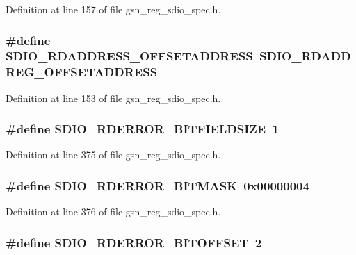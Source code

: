Definition at line 157 of file gsn\_\-reg\_\-sdio\_\-spec.h.

\hypertarget{a00571_a530884998f656b08aed3fd0bcf1faff3}{
\subsubsection[{SDIO\_\-RDADDRESS\_\-OFFSETADDRESS}]{\setlength{\rightskip}{0pt plus 5cm}\#define SDIO\_\-RDADDRESS\_\-OFFSETADDRESS~SDIO\_\-RDADDREG\_\-OFFSETADDRESS}}
\label{a00571_a530884998f656b08aed3fd0bcf1faff3}


Definition at line 153 of file gsn\_\-reg\_\-sdio\_\-spec.h.

\hypertarget{a00571_afa6efbd0fd9485ff2f5287816d165018}{
\subsubsection[{SDIO\_\-RDERROR\_\-BITFIELDSIZE}]{\setlength{\rightskip}{0pt plus 5cm}\#define SDIO\_\-RDERROR\_\-BITFIELDSIZE~1}}
\label{a00571_afa6efbd0fd9485ff2f5287816d165018}


Definition at line 375 of file gsn\_\-reg\_\-sdio\_\-spec.h.

\hypertarget{a00571_a911fbd846c95587f94b5bf9f966b0512}{
\subsubsection[{SDIO\_\-RDERROR\_\-BITMASK}]{\setlength{\rightskip}{0pt plus 5cm}\#define SDIO\_\-RDERROR\_\-BITMASK~0x00000004}}
\label{a00571_a911fbd846c95587f94b5bf9f966b0512}


Definition at line 376 of file gsn\_\-reg\_\-sdio\_\-spec.h.

\hypertarget{a00571_aa7b5462d2a31b319c87b1df023281f91}{
\subsubsection[{SDIO\_\-RDERROR\_\-BITOFFSET}]{\setlength{\rightskip}{0pt plus 5cm}\#define SDIO\_\-RDERROR\_\-BITOFFSET~2}}
\label{a00571_aa7b5462d2a31b319c87b1df023281f91}


